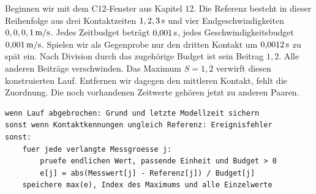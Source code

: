 Beginnen wir mit dem C12-Fenster aus Kapitel 12. Die Referenz besteht in dieser Reihenfolge aus drei Kontaktzeiten \(1,2,3\,\mathrm{s}\) und vier Endgeschwindigkeiten \(0,0,0,1\,\mathrm{m/s}\). Jedes Zeitbudget beträgt \(0{,}001\,\mathrm{s}\), jedes Geschwindigkeitsbudget \(0{,}001\,\mathrm{m/s}\). Spielen wir als Gegenprobe nur den dritten Kontakt um \(0{,}0012\,\mathrm{s}\) zu spät ein. Nach Division durch das zugehörige Budget ist sein Beitrag \(1{,}2\). Alle anderen Beiträge verschwinden. Das Maximum \(S=1{,}2\) verwirft diesen konstruierten Lauf. Entfernen wir dagegen den mittleren Kontakt, fehlt die Zuordnung. Die noch vorhandenen Zeitwerte gehören jetzt zu anderen Paaren.

{\small\begin{verbatim}
wenn Lauf abgebrochen: Grund und letzte Modellzeit sichern
sonst wenn Kontaktkennungen ungleich Referenz: Ereignisfehler
sonst:
    fuer jede verlangte Messgroesse j:
        pruefe endlichen Wert, passende Einheit und Budget > 0
        e[j] = abs(Messwert[j] - Referenz[j]) / Budget[j]
    speichere max(e), Index des Maximums und alle Einzelwerte
\end{verbatim}}
